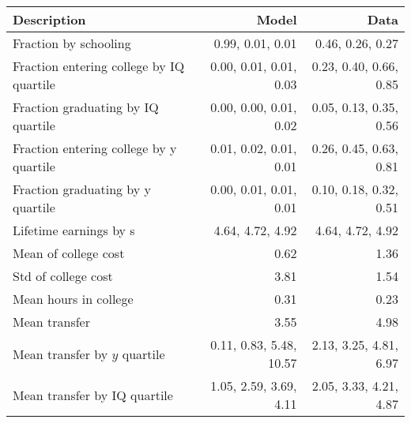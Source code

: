 \begin{tabular}{lrr}
\hline
Description & Model  & Data  \\
\hline
Fraction by schooling & 0.99, 0.01, 0.01  & 0.46, 0.26, 0.27  \\
Fraction entering college by IQ quartile & 0.00, 0.01, 0.01, 0.03  & 0.23, 0.40, 0.66, 0.85  \\
Fraction graduating by IQ quartile & 0.00, 0.00, 0.01, 0.02  & 0.05, 0.13, 0.35, 0.56  \\
Fraction entering college by y quartile & 0.01, 0.02, 0.01, 0.01  & 0.26, 0.45, 0.63, 0.81  \\
Fraction graduating by y quartile & 0.00, 0.01, 0.01, 0.01  & 0.10, 0.18, 0.32, 0.51  \\
Lifetime earnings by s & 4.64, 4.72, 4.92  & 4.64, 4.72, 4.92  \\
Mean of college cost & 0.62  & 1.36  \\
Std of college cost & 3.81  & 1.54  \\
Mean hours in college & 0.31  & 0.23  \\
Mean transfer & 3.55  & 4.98  \\
Mean transfer by $y$ quartile & 0.11, 0.83, 5.48, 10.57  & 2.13, 3.25, 4.81, 6.97  \\
Mean transfer by IQ quartile & 1.05, 2.59, 3.69, 4.11  & 2.05, 3.33, 4.21, 4.87  \\
\hline
\end{tabular}%
